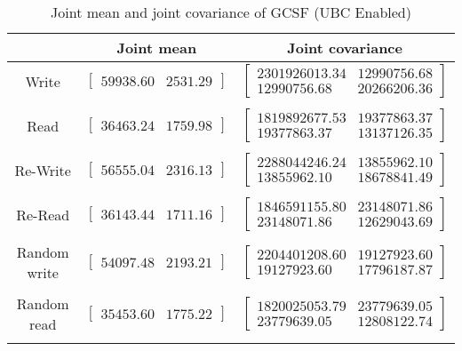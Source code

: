 
	\begin{table}
	\caption{Joint mean and joint covariance of GCSF (UBC Enabled)}
	\begin{tabular}{| c | c | c |}
	\hline
	{} & \textbf{Joint mean} & \textbf{Joint covariance}\\
	\hline
	\hline
Write & $\left[ \begin{array}{rr} 59938.60 & 2531.29 \end{array}\right] $ & $\left[ \begin{array}{rr} 2301926013.34 & 12990756.68 \\ 12990756.68 & 20266206.36 \end{array}\right] $\\ 
{} & {} & {} \\ 
Read & $\left[ \begin{array}{rr} 36463.24 & 1759.98 \end{array}\right] $ & $\left[ \begin{array}{rr} 1819892677.53 & 19377863.37 \\ 19377863.37 & 13137126.35 \end{array}\right] $\\ 
{} & {} & {} \\ 
Re-Write & $\left[ \begin{array}{rr} 56555.04 & 2316.13 \end{array}\right] $ & $\left[ \begin{array}{rr} 2288044246.24 & 13855962.10 \\ 13855962.10 & 18678841.49 \end{array}\right] $\\ 
{} & {} & {} \\ 
Re-Read & $\left[ \begin{array}{rr} 36143.44 & 1711.16 \end{array}\right] $ & $\left[ \begin{array}{rr} 1846591155.80 & 23148071.86 \\ 23148071.86 & 12629043.69 \end{array}\right] $\\ 
{} & {} & {} \\ 
Random write & $\left[ \begin{array}{rr} 54097.48 & 2193.21 \end{array}\right] $ & $\left[ \begin{array}{rr} 2204401208.60 & 19127923.60 \\ 19127923.60 & 17796187.87 \end{array}\right] $\\ 
{} & {} & {} \\ 
Random read & $\left[ \begin{array}{rr} 35453.60 & 1775.22 \end{array}\right] $ & $\left[ \begin{array}{rr} 1820025053.79 & 23779639.05 \\ 23779639.05 & 12808122.74 \end{array}\right] $\\ 
{} & {} & {} \\ 

	\hline
	\end{tabular}
	\label{tbl:stat-gcsf_ubc_enabled}
	\end{table}
